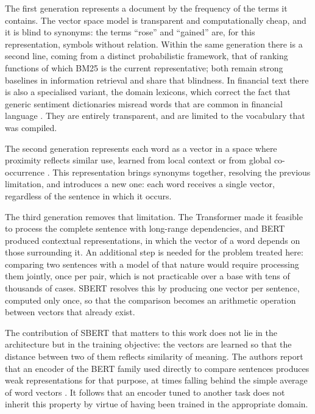 The first generation represents a document by the frequency of the terms it contains. The vector
space model \autocite{salton1975vsm} is transparent and computationally cheap, and it is blind to
synonyms: the terms ``rose'' and ``gained'' are, for this representation, symbols without relation.
Within the same generation there is a second line, coming from a distinct probabilistic framework,
that of ranking functions of which BM25 \autocite{robertson2009bm25} is the current
representative; both remain strong baselines in information retrieval and share that blindness. In
financial text there is also a specialised variant, the domain lexicons, which correct the fact
that generic sentiment dictionaries misread words that are common in financial language
\autocite{loughran2011liability}. They are entirely transparent, and are limited to the vocabulary
that was compiled.

The second generation represents each word as a vector in a space where proximity reflects similar
use, learned from local context \autocite{mikolov2013word2vec} or from global co-occurrence
\autocite{pennington2014glove}. This representation brings synonyms together, resolving the
previous limitation, and introduces a new one: each word receives a single vector, regardless of
the sentence in which it occurs.

The third generation removes that limitation. The Transformer \autocite{vaswani2017attention} made
it feasible to process the complete sentence with long-range dependencies, and \gls{BERT}
\autocite{devlin2019bert} produced contextual representations, in which the vector of a word
depends on those surrounding it. An additional step is needed for the problem treated here:
comparing two sentences with a model of that nature would require processing them jointly, once per
pair, which is not practicable over a base with tens of thousands of cases. \gls{SBERT}
\autocite{reimers2019sbert} resolves this by producing one vector per sentence, computed only once,
so that the comparison becomes an arithmetic operation between vectors that already exist.

The contribution of \gls{SBERT} that matters to this work does not lie in the architecture but in
the training objective: the vectors are learned so that the distance between two of them reflects
similarity of meaning. The authors report that an encoder of the \gls{BERT} family used directly to
compare sentences produces weak representations for that purpose, at times falling behind the
simple average of word vectors \autocite{reimers2019sbert}. It follows that an encoder tuned to
another task does not inherit this property by virtue of having been trained in the appropriate
domain.

